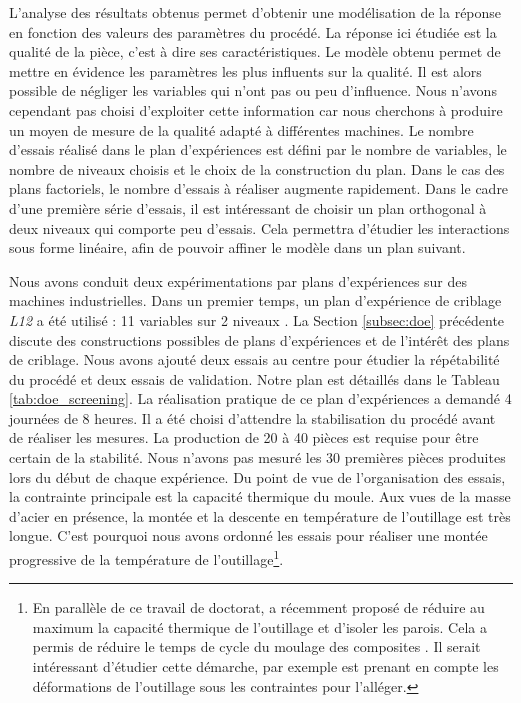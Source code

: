 L'analyse des résultats obtenus permet d'obtenir une modélisation de la réponse en fonction des valeurs des paramètres du procédé.
La réponse ici étudiée est la qualité de la pièce, c'est à dire ses caractéristiques.
Le modèle obtenu permet de mettre en évidence les paramètres les plus influents sur la qualité.
Il est alors possible de négliger les variables qui n'ont pas ou peu d'influence.
Nous n'avons cependant pas choisi d'exploiter cette information car nous cherchons à produire un moyen de mesure de la qualité adapté à différentes machines.
Le nombre d'essais réalisé dans le plan d'expériences est défini par le nombre de variables, le nombre de niveaux choisis et le choix de la construction du plan.
Dans le cas des plans factoriels, le nombre d'essais à réaliser augmente rapidement.
Dans le cadre d'une première série d'essais, il est intéressant de choisir un plan orthogonal à deux niveaux qui comporte peu d'essais.
Cela permettra d'étudier les interactions sous forme linéaire, afin de pouvoir affiner le modèle dans un plan suivant.

Nous avons conduit deux expérimentations par plans d'expériences sur des machines industrielles.
Dans un premier temps, un plan d'expérience de criblage \textit{L12} a été utilisé : 11 variables sur 2 niveaux \cite{plackett_design_1946}.
La Section \ref{subsec:doe} précédente discute des constructions possibles de plans d'expériences et de l'intérêt des plans de criblage.
Nous avons ajouté deux essais au centre pour étudier la répétabilité du procédé et deux essais de validation.
Notre plan est détaillés dans le Tableau \ref{tab:doe_screening}.
La réalisation pratique de ce plan d'expériences a demandé 4 journées de 8 heures.
Il a été choisi d'attendre la stabilisation du procédé avant de réaliser les mesures.
La production de 20 à 40 pièces est requise pour être certain de la stabilité.
Nous n'avons pas mesuré les 30 premières pièces produites lors du début de chaque expérience.
Du point de vue de l'organisation des essais, la contrainte principale est la capacité thermique du moule.
Aux vues de la masse d'acier en présence, la montée et la descente en température de l'outillage est très longue.
C'est pourquoi nous avons ordonné les essais pour réaliser une montée progressive de la température de l'outillage\footnote{En parallèle de ce travail de doctorat, \citeauthor{collomb_2018} a récemment proposé de réduire au maximum la capacité thermique de l'outillage et d'isoler les parois. Cela a permis de réduire le temps de cycle du moulage des composites \cite{collomb_2018}.
Il serait intéressant d'étudier cette démarche, par exemple est prenant en compte les déformations de l'outillage sous les contraintes pour l'alléger.}.

